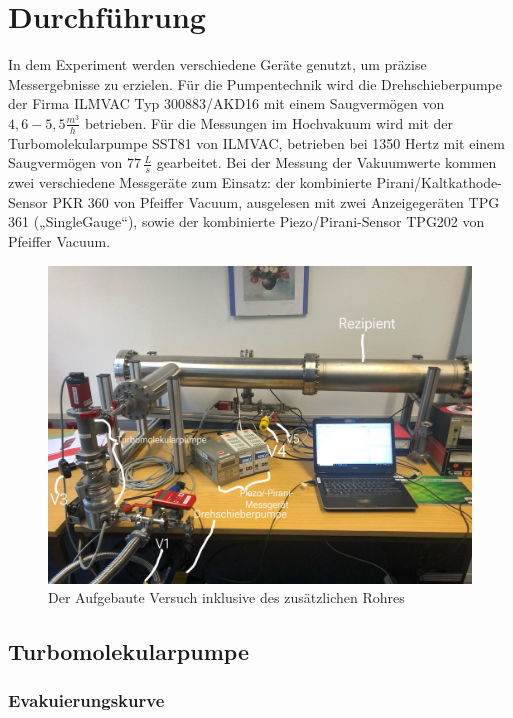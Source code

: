 \section{Durchführung}
\label{sec:Durchführung}

In dem Experiment werden verschiedene Geräte genutzt, um präzise Messergebnisse zu erzielen.
Für die Pumpentechnik wird die Drehschieberpumpe der Firma ILMVAC Typ 300883/AKD16 mit einem Saugvermögen von \(4,6-5,5 \frac{m^3}{h}\)
betrieben. Für die Messungen im Hochvakuum wird mit der Turbomolekularpumpe SST81 von ILMVAC, betrieben bei 1350 Hertz mit
einem Saugvermögen von \(77 \, \frac{L}{s}\) gearbeitet. Bei der Messung der Vakuumwerte kommen zwei verschiedene Messgeräte zum Einsatz:
der kombinierte Pirani/Kaltkathode-Sensor PKR 360 von Pfeiffer Vacuum, ausgelesen mit zwei Anzeigegeräten TPG 361 („SingleGauge“),
sowie der kombinierte Piezo/Pirani-Sensor TPG202 von Pfeiffer Vacuum.


\begin{figure}
    \includegraphics[width=\textwidth]{bilder/Aufbau.jpeg}
    \caption{Der Aufgebaute Versuch inklusive des zusätzlichen Rohres}
\end{figure}


\subsection{Turbomolekularpumpe}
\subsubsection{Evakuierungskurve}


